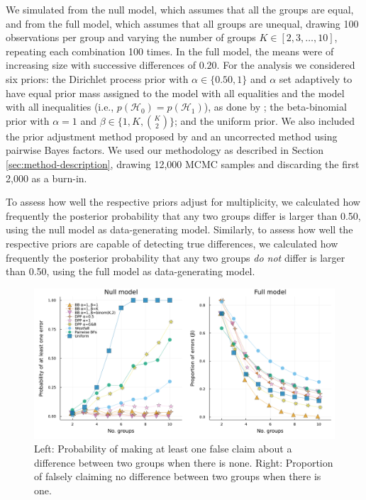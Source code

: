 \documentclass[11pt,a4paper]{article}
\theoremstyle{definition} %
\theoremstyle{case}
\newcommand{\FD}[1]{\textcolor{red}{Fabian: #1 }}
\begin{document}
We simulated from the null model, which assumes that all the groups are equal, and from the full model, which assumes that all groups are unequal, drawing 100 observations per group and varying the number of groups $K \in [2, 3, \dots, 10]$, repeating each combination 100 times. In the full model, the means were of increasing size with successive differences of $0.20$. For the analysis we considered six priors: the Dirichlet process prior with $\alpha \in \{0.50, 1\}$ and $\alpha$ set adaptively to have equal prior mass assigned to the model with all equalities and the model with all inequalities (i.e., $p(\mathcal{H}_0) = p(\mathcal{H}_1)$), as done by \textcite{gopalan1998bayesian}; the beta-binomial prior with $\alpha = 1$ and $\beta \in \{1, K, {K \choose 2}\}$; and the uniform prior. We also included the prior adjustment method proposed by \textcite{westfall1997bayesian} and an uncorrected method using pairwise Bayes factors. We used our methodology as described in Section \ref{sec:method-description}, drawing 12,000 MCMC samples and discarding the first 2,000 as a burn-in.

To assess how well the respective priors adjust for multiplicity, we calculated how frequently the posterior probability that any two groups differ is larger than 0.50, using the null model as data-generating model. Similarly, to assess how well the respective priors are capable of detecting true differences, we calculated how frequently the posterior probability that any two groups \textit{do not} differ is larger than 0.50, using the full model as data-generating model.

\begin{figure}
    \centering
    \includegraphics[width=1\textwidth]{2_panel_alpha_familywise.pdf}
    \caption{Left: Probability of making at least one false claim about a difference between two groups when there is none. Right: Proportion of falsely claiming no difference between two groups when there is one. %
    }
    \label{fig:small_simulation}
\end{figure}
\end{document}

